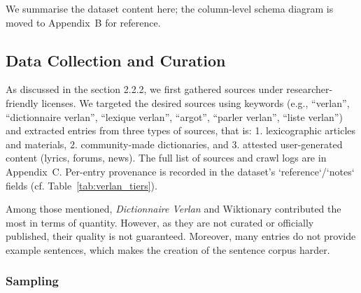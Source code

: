 \documentclass[12pt]{article}
\begin{document}
We summarise the dataset content here; the column-level schema diagram is moved to Appendix~B for reference.

\begin{table}[H]
\centering
\caption{Dataset at a glance (snapshot as of September 2025).}
\label{tab:dataset-glance}
\end{table}


\subsection{Data Collection and Curation}
As discussed in the section 2.2.2, we first gathered sources under researcher-friendly licenses. We targeted the desired sources using keywords (e.g., ``verlan'', ``dictionnaire verlan'', ``lexique verlan'', ``argot'', ``parler verlan'', ``liste verlan'') and extracted entries from three types of sources, that is: 1. lexicographic articles and materials, 2. community-made dictionaries, and 3. attested user-generated content (lyrics, forums, news). The full list of sources and crawl logs are in Appendix~C. Per-entry provenance is recorded in the dataset's `reference`/`notes` fields (cf. Table~\ref{tab:verlan_tiers}).

Among those mentioned, \textit{Dictionnaire Verlan} and Wiktionary contributed the most in terms of quantity. However, as they are not curated or officially published, their quality is not guaranteed. Moreover, many entries do not provide example sentences, which makes the creation of the sentence corpus harder.

\subsubsection{Sampling}
\end{document}

